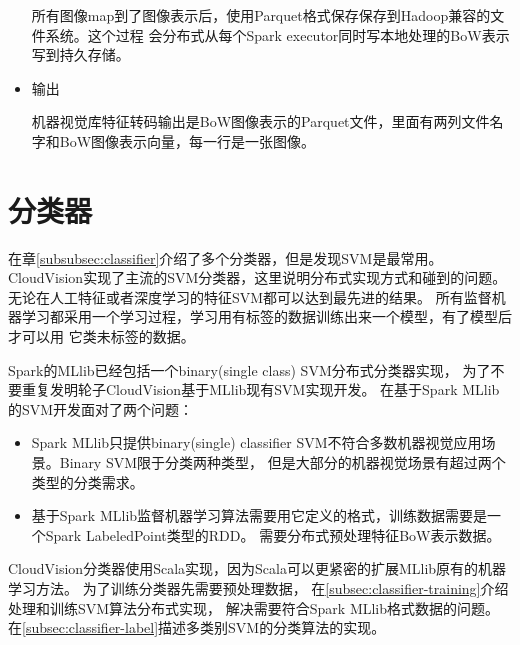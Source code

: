 \begin{itemize}
        所有图像map到了图像表示后，使用Parquet格式保存保存到Hadoop兼容的文件系统。这个过程
        会分布式从每个Spark executor同时写本地处理的BoW表示写到持久存储。

      
  \item 输出

        机器视觉库特征转码输出是BoW图像表示的Parquet文件，里面有两列文件名字和BoW图像表示向量，每一行是一张图像。

\end{itemize}


\section{分类器}
\label{sec:cloudvision_classifier}
在章\ref{subsubsec:classifier}介绍了多个分类器，但是发现SVM是最常用。
CloudVision实现了主流的SVM分类器，这里说明分布式实现方式和碰到的问题。
无论在人工特征或者深度学习的特征SVM都可以达到最先进的结果。
所有监督机器学习都采用一个学习过程，学习用有标签的数据训练出来一个模型，有了模型后才可以用
它类未标签的数据。


Spark的MLlib已经包括一个binary(single class) SVM分布式分类器实现，
为了不要重复发明轮子CloudVision基于MLlib现有SVM实现开发。
在基于Spark MLlib的SVM开发面对了两个问题：
\begin{itemize}
  \item Spark MLlib只提供binary(single) classifier SVM不符合多数机器视觉应用场景。Binary SVM限于分类两种类型，
        但是大部分的机器视觉场景有超过两个类型的分类需求。
  \item 基于Spark MLlib监督机器学习算法需要用它定义的格式，训练数据需要是一个Spark LabeledPoint类型的RDD。
        需要分布式预处理特征BoW表示数据。
\end{itemize}

CloudVision分类器使用Scala实现，因为Scala可以更紧密的扩展MLlib原有的机器学习方法。
为了训练分类器先需要预处理数据，
在\ref{subsec:classifier-training}介绍处理和训练SVM算法分布式实现，
解决需要符合Spark MLlib格式数据的问题。
在\ref{subsec:classifier-label}描述多类别SVM的分类算法的实现。



